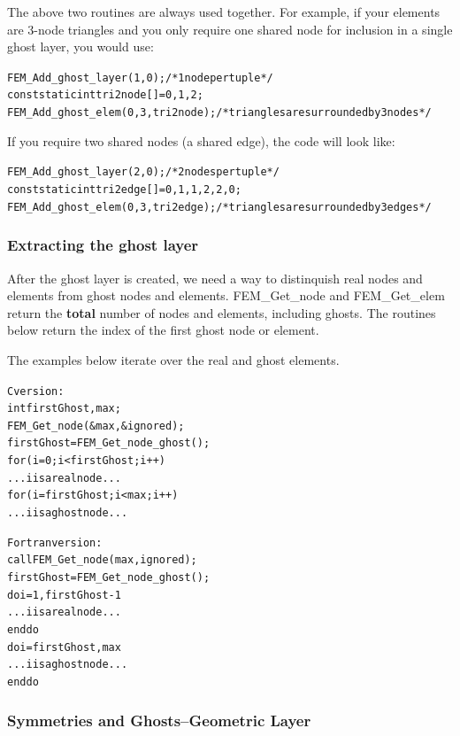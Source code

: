 \documentclass[10pt]{article}
\begin{document}
The above two routines are always used together. For example, if your elements are 3-node triangles and you only require one shared node for inclusion in a single ghost layer, you would use:
\begin{alltt}
   FEM\_Add\_ghost\_layer(1,0); /* 1 node per tuple */
   const static int tri2node[]={0,1,2};
   FEM\_Add\_ghost\_elem(0,3,tri2node); /* triangles are surrounded by 3 nodes */
\end{alltt}

If you require two shared nodes (a shared edge), the code will look like:
\begin{alltt}    
   FEM\_Add\_ghost\_layer(2,0); /* 2 nodes per tuple */
   const static int tri2edge[]={0,1,  1,2,  2,0};
   FEM\_Add\_ghost\_elem(0,3,tri2edge); /*triangles are surrounded by 3 edges */
\end{alltt}



\subsubsection{Extracting the ghost layer}
After the ghost layer is created, we need a way to distinquish real nodes and elements 
from ghost nodes and elements. FEM\_Get\_node and FEM\_Get\_elem return the 
\textbf{total} number of nodes and elements, including ghosts. The routines below 
return the index of the first ghost node or element.

The examples below iterate over the real and ghost elements.
\begin{alltt}
C version:
        int firstGhost,max;
        FEM\_Get\_node(\&max, \&ignored);
        firstGhost=FEM\_Get\_node\_ghost();
        for (i=0;i<firstGhost;i++)
                ... i is a real node...
        for (i=firstGhost;i<max;i++)
                ... i is a ghost node ...

Fortran version:
        call FEM\_Get\_node(max,ignored);
        firstGhost=FEM\_Get\_node\_ghost();
        do i=1,firstGhost-1
                ... i is a real node...
        end do
        do i=firstGhost,max
                ... i is a ghost node...
        end do
\end{alltt}

\subsubsection{Symmetries and Ghosts--Geometric Layer}
\end{document}
